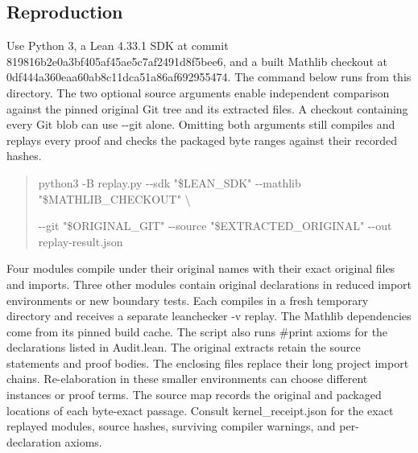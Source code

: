 \documentclass[11pt,letterpaper]{article}
\begin{document}
\subsection{Reproduction}
Use Python 3, a Lean 4.33.1 SDK at commit {\ttfamily\small 819816b2e0a3bf\allowbreak{}405af45ae5c7af\allowbreak{}2491d8f5bee6}, and a built Mathlib checkout at {\ttfamily\small 0df444a360eaa6\allowbreak{}0ab8c11dca51a8\allowbreak{}6af692955474}. The command below runs from this directory. The two optional source arguments enable independent comparison against the pinned original Git tree and its extracted files. A checkout containing every Git blob can use {\ttfamily\small -\allowbreak{}-\allowbreak{}git} alone. Omitting both arguments still compiles and replays every proof and checks the packaged byte ranges against their recorded hashes.

\begin{quote}\raggedright\setlength{\parskip}{1pt}
{\ttfamily\small python3 -\allowbreak{}B replay.\allowbreak{}py -\allowbreak{}-\allowbreak{}sdk "\$LEAN\_\allowbreak{}SDK" -\allowbreak{}-\allowbreak{}mathlib "\$MATHLIB\_\allowbreak{}CHECKOUT" \textbackslash{}}\par
{\ttfamily\small   -\allowbreak{}-\allowbreak{}git "\$ORIGINAL\_\allowbreak{}GIT" -\allowbreak{}-\allowbreak{}source "\$EXTRACTED\_\allowbreak{}ORIGINAL" -\allowbreak{}-\allowbreak{}out replay-\allowbreak{}result.\allowbreak{}json}\par
\end{quote}
Four modules compile under their original names with their exact original files and imports. Three other modules contain original declarations in reduced import environments or new boundary tests. Each compiles in a fresh temporary directory and receives a separate {\ttfamily\small leanchecker -\allowbreak{}v} replay. The Mathlib dependencies come from its pinned build cache. The script also runs {\ttfamily\small \#print axioms} for the declarations listed in {\ttfamily\small Audit.\allowbreak{}lean}. The original extracts retain the source statements and proof bodies. The enclosing files replace their long project import chains. Re-elaboration in these smaller environments can choose different instances or proof terms. The source map records the original and packaged locations of each byte-exact passage. Consult {\ttfamily\small kernel\_\allowbreak{}receipt.\allowbreak{}json} for the exact replayed modules, source hashes, surviving compiler warnings, and per-declaration axioms.
\end{document}

